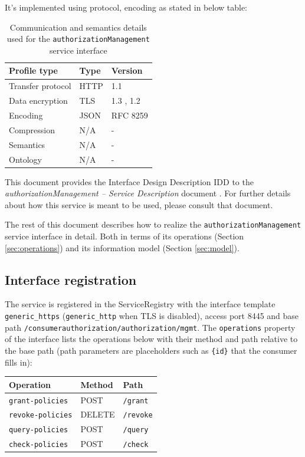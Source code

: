 \documentclass[a4paper]{arrowhead}
\begin{document}
It's implemented using protocol, encoding as stated in below table:
\begin{table}[ht!]
  \centering
  \begin{tabular}{|l|l|l|}
    \hline
    \rowcolor{gray!33} Profile type & Type & Version \\ \hline
    Transfer protocol & HTTP & 1.1 \cite{rfc9112} \\ \hline
    Data encryption & TLS & 1.3 \cite{rfc8446}, 1.2 \cite{rfc5246} \\ \hline
    Encoding & JSON & RFC 8259 \cite{rfc8259} \\ \hline
    Compression & N/A & - \\ \hline
    Semantics & N/A & - \\ \hline
    Ontology & N/A & - \\ \hline
  \end{tabular}
  \caption{Communication and semantics details used for the \texttt{authorization\allowbreak{}Management} service interface}
  \label{tab:comunication_semantics_profile}
\end{table}

This document provides the Interface Design Description IDD to the \textit{authorizationManagement -- Service Description} document \cite{ca-authorizationManagement-sd}.
For further details about how this service is meant to be used, please consult that document.

The rest of this document describes how to realize the \texttt{authorization\allowbreak{}Management} service
interface in detail. Both in terms of its operations (Section \ref{sec:operations}) and its information model (Section \ref{sec:model}).

\subsection{Interface registration}

The service is registered in the ServiceRegistry with the interface template \texttt{generic\_\allowbreak{}https} (\texttt{generic\_\allowbreak{}http} when TLS is disabled), access port 8445 and base path \texttt{/\allowbreak{}consumerauthorization/\allowbreak{}authorization/\allowbreak{}mgmt}. The \texttt{operations} property of the interface lists the operations below with their method and path relative to the base path (path parameters are placeholders such as \texttt{\{id\}} that the consumer fills in):

\noindent\begin{longtable}{| p{5.2cm} | p{1.6cm} | p{8.4cm} |} \hline
\rowcolor{gray!33} Operation & Method & Path \\ \hline \endhead
\texttt{grant-\allowbreak{}policies} & POST & \texttt{/\allowbreak{}grant} \\ \hline
\texttt{revoke-\allowbreak{}policies} & DELETE & \texttt{/\allowbreak{}revoke} \\ \hline
\texttt{query-\allowbreak{}policies} & POST & \texttt{/\allowbreak{}query} \\ \hline
\texttt{check-\allowbreak{}policies} & POST & \texttt{/\allowbreak{}check} \\ \hline
\end{longtable}
\end{document}
